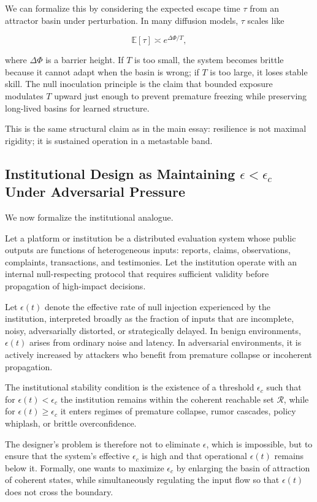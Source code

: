 \documentclass[12pt]{article}
\begin{document}
We can formalize this by considering the expected escape time $\tau$ from an attractor basin under perturbation. In many diffusion models, $\tau$ scales like

\[
\mathbb{E}[\tau] \asymp e^{\Delta \Phi / T},
\]

where $\Delta \Phi$ is a barrier height. If $T$ is too small, the system becomes brittle because it cannot adapt when the basin is wrong; if $T$ is too large, it loses stable skill. The null inoculation principle is the claim that bounded exposure modulates $T$ upward just enough to prevent premature freezing while preserving long-lived basins for learned structure.

This is the same structural claim as in the main essay: resilience is not maximal rigidity; it is sustained operation in a metastable band.


\subsection{Institutional Design as Maintaining $\epsilon < \epsilon_c$ Under Adversarial Pressure}

We now formalize the institutional analogue.

Let a platform or institution be a distributed evaluation system whose public outputs are functions of heterogeneous inputs: reports, claims, observations, complaints, transactions, and testimonies. Let the institution operate with an internal null-respecting protocol that requires sufficient validity before propagation of high-impact decisions.

Let $\epsilon(t)$ denote the effective rate of null injection experienced by the institution, interpreted broadly as the fraction of inputs that are incomplete, noisy, adversarially distorted, or strategically delayed. In benign environments, $\epsilon(t)$ arises from ordinary noise and latency. In adversarial environments, it is actively increased by attackers who benefit from premature collapse or incoherent propagation.

The institutional stability condition is the existence of a threshold $\epsilon_c$ such that for $\epsilon(t) < \epsilon_c$ the institution remains within the coherent reachable set $\mathcal{R}$, while for $\epsilon(t) \ge \epsilon_c$ it enters regimes of premature collapse, rumor cascades, policy whiplash, or brittle overconfidence.

The designer's problem is therefore not to eliminate $\epsilon$, which is impossible, but to ensure that the system's effective $\epsilon_c$ is high and that operational $\epsilon(t)$ remains below it. Formally, one wants to maximize $\epsilon_c$ by enlarging the basin of attraction of coherent states, while simultaneously regulating the input flow so that $\epsilon(t)$ does not cross the boundary.
\end{document}
